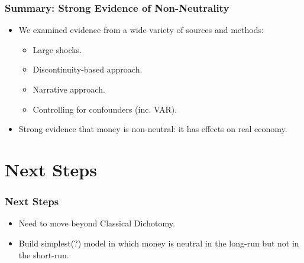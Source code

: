 \documentclass[english,xcolor=svgnames]{beamer}
\begin{document}
\begin{frame}
\frametitle{Summary: Strong Evidence of Non-Neutrality}
\begin{itemize}
	\item We examined evidence from a wide variety of sources and methods:
	\begin{itemize}
		\item Large shocks.
		\item Discontinuity-based approach.
		\item Narrative approach.
		\item Controlling for confounders (inc. VAR).
	\end{itemize}
	\item Strong evidence that money is non-neutral: it has effects on real economy.
\end{itemize}
\end{frame}

\section{Next Steps}

\begin{frame}
\frametitle{Next Steps}
\begin{itemize}
	\item Need to move beyond Classical Dichotomy.
	\item Build simplest(?) model in which money is neutral in the long-run but not in the short-run.
\end{itemize}
\end{frame}
\end{document}
